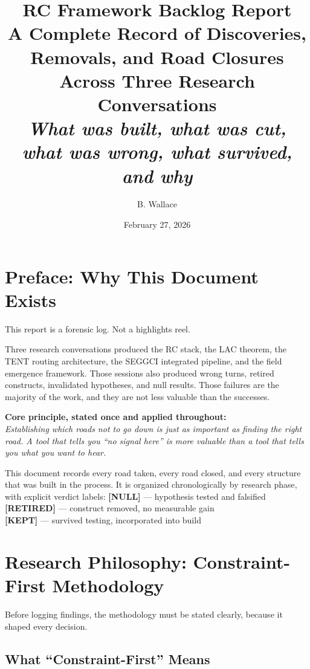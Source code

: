 \documentclass[11pt]{article}
\title{
  \textbf{RC Framework Backlog Report}\\
  \large A Complete Record of Discoveries, Removals, and Road Closures\\
  \large Across Three Research Conversations\\[0.5em]
  \normalsize \textit{What was built, what was cut, what was wrong, what survived, and why}
}
\author{B. Wallace}
\date{February 27, 2026}
\begin{document}
\maketitle
\tableofcontents
\newpage

\section{Preface: Why This Document Exists}

This report is a forensic log. Not a highlights reel.

Three research conversations produced the RC stack, the LAC theorem, the TENT routing architecture, the SEGGCI integrated pipeline, and the field emergence framework. Those sessions also produced wrong turns, retired constructs, invalidated hypotheses, and null results. Those failures are the majority of the work, and they are not less valuable than the successes.

\begin{graybox}
\textbf{Core principle, stated once and applied throughout:}\\
\textit{Establishing which roads not to go down is just as important as finding the right road. A tool that tells you ``no signal here'' is more valuable than a tool that tells you what you want to hear.}
\end{graybox}

This document records every road taken, every road closed, and every structure that was built in the process. It is organized chronologically by research phase, with explicit verdict labels:
\textcolor{nullred}{\textbf{[NULL]}} --- hypothesis tested and falsified\\
\textcolor{warnyellow}{\textbf{[RETIRED]}} --- construct removed, no measurable gain\\
\textcolor{keepgreen}{\textbf{[KEPT]}} --- survived testing, incorporated into build

\section{Research Philosophy: Constraint-First Methodology}
\label{sec:philosophy}

Before logging findings, the methodology must be stated clearly, because it shaped every decision.

\subsection{What ``Constraint-First'' Means}
\end{document}
